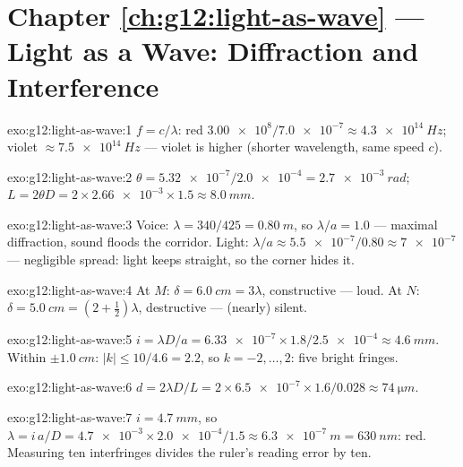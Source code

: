 \section*{Chapter \ref{ch:g12:light-as-wave} --- Light as a Wave: Diffraction and Interference}

\begin{solution}{exo:g12:light-as-wave:1}
$f = c/\lambda$: red $\num{3.00e8}/\num{7.0e-7} \approx
\qty{4.3e14}{Hz}$; violet $\approx \qty{7.5e14}{Hz}$ --- violet is
higher (shorter wavelength, same speed $c$).
\end{solution}

\begin{solution}{exo:g12:light-as-wave:2}
$\theta = \num{5.32e-7}/\num{2.0e-4} = \qty{2.7e-3}{rad}$;
$L = 2\theta D = 2 \times \num{2.66e-3} \times 1.5 \approx
\qty{8.0}{mm}$.
\end{solution}

\begin{solution}{exo:g12:light-as-wave:3}
Voice: $\lambda = 340/425 = \qty{0.80}{m}$, so $\lambda/a = 1.0$ ---
maximal diffraction, sound floods the corridor. Light:
$\lambda/a \approx \num{5.5e-7}/0.80 \approx \num{7e-7}$ ---
negligible spread: light keeps straight, so the corner hides it.
\end{solution}

\begin{solution}{exo:g12:light-as-wave:4}
At $M$: $\delta = \qty{6.0}{cm} = 3\lambda$, constructive --- loud.
At $N$: $\delta = \qty{5.0}{cm} = (2 + \tfrac12)\lambda$, destructive
--- (nearly) silent.
\end{solution}

\begin{solution}{exo:g12:light-as-wave:5}
$i = \lambda D/a = \num{6.33e-7} \times 1.8/\num{2.5e-4} \approx
\qty{4.6}{mm}$. Within $\pm\qty{1.0}{cm}$: $|k| \leq 10/4.6 = 2.2$,
so $k = -2, \dots, 2$: five bright fringes.
\end{solution}

\begin{solution}{exo:g12:light-as-wave:6}
$d = 2\lambda D/L = 2 \times \num{6.5e-7} \times 1.6/0.028 \approx
\qty{74}{\micro m}$.
\end{solution}

\begin{solution}{exo:g12:light-as-wave:7}
$i = \qty{4.7}{mm}$, so $\lambda = i\,a/D = \num{4.7e-3} \times
\num{2.0e-4}/1.5 \approx \qty{6.3e-7}{m} = \qty{630}{nm}$: red.
Measuring ten interfringes divides the ruler's reading error by ten.
\end{solution}

